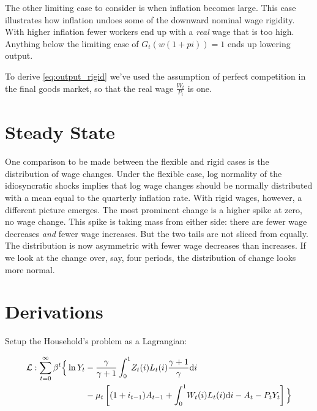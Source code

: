 \documentclass[12pt,a4paper]{scrartcl}            %
\begin{document}
The other limiting case to consider is when inflation becomes large.
This case illustrates how inflation undoes some of the downward nominal wage rigidity.
With higher inflation fewer workers end up with a \emph{real} wage that is too high.
Anything below the limiting case of $G_t(w (1 + pi)) = 1$ ends up lowering output.

To derive \eqref{eq:output_rigid} we've used the assumption of perfect competition in the final goods market, so that the real wage $\frac{W_t}{P_t}$ is one.

\section{Steady State}
\label{sec:steady_state}

One comparison to be made between the flexible and rigid cases is the distribution of wage changes.
Under the flexible case, log normality of the idiosyncratic shocks implies that log wage changes should be normally distributed with a mean equal to the quarterly inflation rate.
With rigid wages, however, a different picture emerges.
The most prominent change is a higher spike at zero, no wage change.
This spike is taking mass from either side: there are fewer wage decreases \emph{and} fewer wage increases.
But the two tails are not sliced from equally.
The distribution is now asymmetric with fewer wage decreases than increases.
If we look at the change over, say, four periods, the distribution of change looks more normal.


\newpage



\newpage
\appendix

\section{Derivations}

Setup the Household's problem as a Lagrangian:

\begin{equation}
    \label{eqa:houehold}
    \begin{split}
        \mathcal{L} : \sum_{t=0}^{\infty} \beta^t \Big\{ \ln Y_t & - \frac{\gamma}{\gamma + 1} \int_{0}^{1} \! Z_t(i)L_t(i) \frac{\gamma + 1}{\gamma} \mathrm{d}i \\
                                                           & - \mu_t \left[ (1 + i_{t-1})A_{t-1} + \int_{0}^{1} \! W_t(i)L_t(i) \mathrm{d}i  - A_t - P_tY_t\right] \Big\}
    \end{split}
\end{equation}
\end{document}

